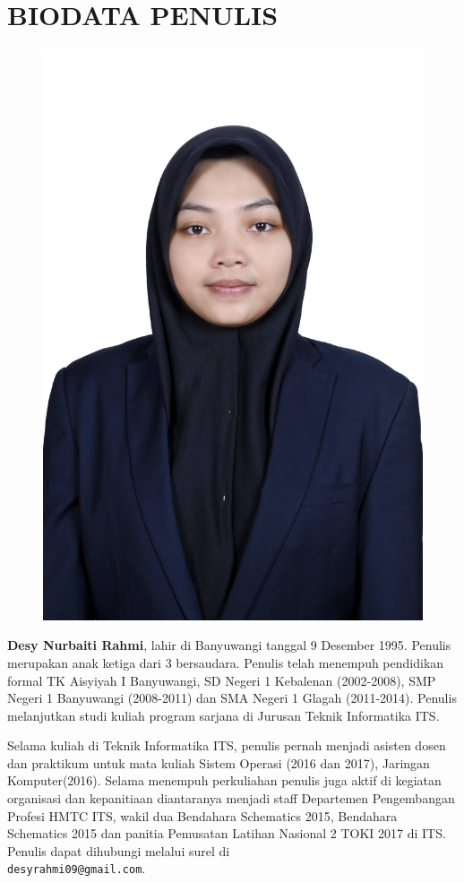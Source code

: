 \chapter{BIODATA PENULIS}
\begin{figure}
\includegraphics[height=0.3\textheight]{biodata/foto.JPG}
\end{figure}

\textbf{Desy Nurbaiti Rahmi}, lahir di Banyuwangi tanggal 9 Desember 1995. Penulis merupakan anak ketiga dari 3 bersaudara. Penulis telah menempuh pendidikan formal TK Aisyiyah I Banyuwangi, SD Negeri 1 Kebalenan (2002-2008), SMP Negeri 1 Banyuwangi (2008-2011) dan SMA Negeri 1 Glagah (2011-2014). Penulis melanjutkan studi kuliah program sarjana di Jurusan Teknik Informatika ITS. 

Selama kuliah di Teknik Informatika ITS, penulis  pernah menjadi asisten dosen dan praktikum untuk mata kuliah Sistem Operasi (2016 dan 2017), Jaringan Komputer(2016). Selama menempuh perkuliahan penulis juga aktif di kegiatan organisasi dan kepanitiaan diantaranya menjadi staff Departemen Pengembangan Profesi HMTC ITS, wakil dua Bendahara Schematics 2015, Bendahara Schematics 2015 dan panitia Pemusatan Latihan Nasional 2 TOKI 2017 di ITS. Penulis dapat dihubungi melalui surel di \\ \texttt{desyrahmi09@gmail.com}.
